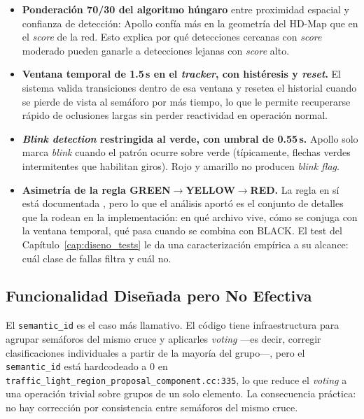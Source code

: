 \begin{itemize}
    \item \textbf{Ponderación 70/30 del algoritmo húngaro} entre proximidad espacial y confianza de detección: Apollo confía más en la geometría del HD-Map que en el \textit{score} de la red. Esto explica por qué detecciones cercanas con \textit{score} moderado pueden ganarle a detecciones lejanas con \textit{score} alto.

    \item \textbf{Ventana temporal de 1.5\,s en el \textit{tracker}, con histéresis y \textit{reset}.} El sistema valida transiciones dentro de esa ventana y resetea el historial cuando se pierde de vista al semáforo por más tiempo, lo que le permite recuperarse rápido de oclusiones largas sin perder reactividad en operación normal.

    \item \textbf{\textit{Blink detection} restringida al verde, con umbral de 0.55\,s.} Apollo solo marca \textit{blink} cuando el patrón ocurre sobre verde (típicamente, flechas verdes intermitentes que habilitan giros). Rojo y amarillo no producen \textit{blink flag}.

    \item \textbf{Asimetría de la regla GREEN$\to$YELLOW$\to$RED.} La regla en sí está documentada \cite{apollo_tlr_docs}, pero lo que el análisis aportó es el conjunto de detalles que la rodean en la implementación: en qué archivo vive, cómo se conjuga con la ventana temporal, qué pasa cuando se combina con BLACK. El test del Capítulo~\ref{cap:diseno_tests} le da una caracterización empírica a su alcance: cuál clase de fallas filtra y cuál no.
\end{itemize}

\subsection{Funcionalidad Diseñada pero No Efectiva}

El \texttt{semantic\_id} es el caso más llamativo. El código tiene infraestructura para agrupar semáforos del mismo cruce y aplicarles \textit{voting} ---es decir, corregir clasificaciones individuales a partir de la mayoría del grupo---, pero el \texttt{semantic\_id} está hardcodeado a 0 en \texttt{traffic\_light\_region\_proposal\_component.cc:335}, lo que reduce el \textit{voting} a una operación trivial sobre grupos de un solo elemento. La consecuencia práctica: no hay corrección por consistencia entre semáforos del mismo cruce.

